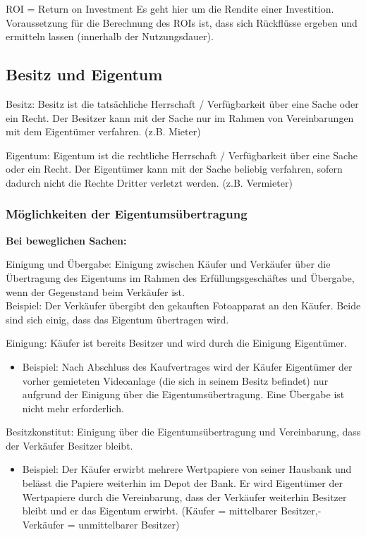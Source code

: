 \documentclass[10pt]{article}
\begin{document}
ROI = Return on Investment
Es geht hier um die Rendite einer Investition. Voraussetzung für die Berechnung des ROIs ist, dass sich Rückflüsse ergeben und ermitteln lassen (innerhalb der Nutzungsdauer).

\subsection{Besitz und Eigentum}
Besitz: Besitz ist die tatsächliche Herrschaft / Verfügbarkeit über eine Sache oder ein Recht. Der Besitzer kann mit der Sache nur im Rahmen von Vereinbarungen mit dem Eigentümer verfahren. (z.B. Mieter)

Eigentum: Eigentum ist die rechtliche Herrschaft / Verfügbarkeit über eine Sache oder ein Recht. Der Eigentümer kann mit der Sache beliebig verfahren, sofern dadurch nicht die Rechte Dritter verletzt werden. (z.B. Vermieter)

\subsubsection{Möglichkeiten der Eigentumsübertragung}
\textbf{Bei beweglichen Sachen:}

Einigung und Übergabe: 
Einigung zwischen Käufer und Verkäufer über die Übertragung des Eigentums im Rahmen des Erfüllungsgeschäftes und Übergabe, wenn der Gegenstand beim Verkäufer ist.\\
Beispiel: Der Verkäufer übergibt den gekauften Fotoapparat an den Käufer. Beide sind sich einig, dass das Eigentum übertragen wird.


Einigung: Käufer ist bereits Besitzer und wird durch die Einigung Eigentümer.
\begin{itemize}
    \item Beispiel: Nach Abschluss des Kaufvertrages wird der Käufer Eigentümer der vorher gemieteten Videoanlage (die sich in seinem Besitz befindet) nur aufgrund der Einigung über die Eigentumsübertragung. Eine Übergabe ist nicht mehr erforderlich.
\end{itemize}


Besitzkonstitut:
Einigung über die Eigentumsübertragung und Vereinbarung, dass der Verkäufer Besitzer bleibt.
\begin{itemize}
    \item Beispiel: Der Käufer erwirbt mehrere Wertpapiere von seiner Hausbank und belässt die Papiere weiterhin im Depot der Bank. Er wird Eigentümer der Wertpapiere durch die Vereinbarung, dass der Verkäufer weiterhin Besitzer bleibt und er das Eigentum erwirbt. (Käufer = mittelbarer Besitzer,- Verkäufer = unmittelbarer Besitzer)
\end{itemize}
\end{document}
